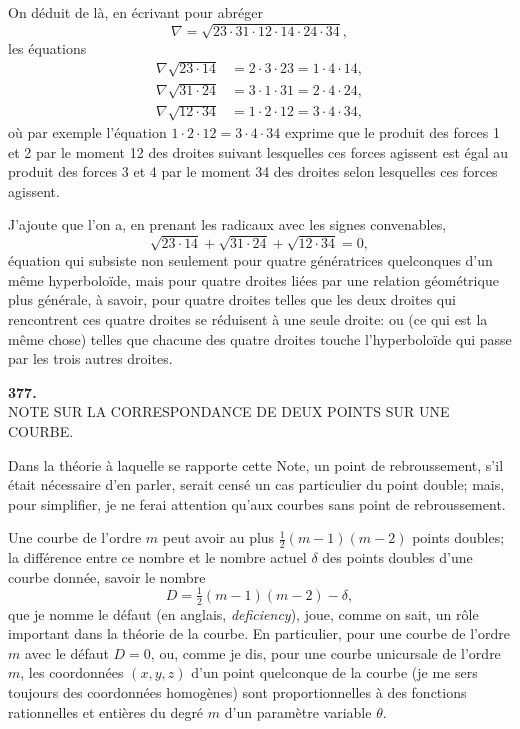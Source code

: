 \documentclass[11pt]{article}
\begin{document}
On d\'eduit de l\`a, en \'ecrivant pour abr\'eger
\[ \nabla = \sqrt{23\cdot 31\cdot 12\cdot 14\cdot 24\cdot 34}, \]
les \'equations
\begin{align*}
\nabla\sqrt{23\cdot 14} &= 2\cdot 3\cdot 23 = 1\cdot 4\cdot 14,\\
\nabla\sqrt{31\cdot 24} &= 3\cdot 1\cdot 31 = 2\cdot 4\cdot 24,\\
\nabla\sqrt{12\cdot 34} &= 1\cdot 2\cdot 12 = 3\cdot 4\cdot 34,
\end{align*}
o\`u par exemple l'\'equation $1\cdot 2\cdot 12 = 3\cdot 4\cdot 34$ exprime que le produit des forces 1 et 2 par le moment 12 des droites suivant lesquelles ces forces agissent est \'egal au produit des forces 3 et 4 par le moment 34 des droites selon lesquelles ces forces agissent.

J'ajoute que l'on a, en prenant les radicaux avec les signes convenables,
\[ \sqrt{23\cdot 14} + \sqrt{31\cdot 24} + \sqrt{12\cdot 34} = 0, \]
\'equation qui subsiste non seulement pour quatre g\'en\'eratrices quelconques d'un m\^eme hyperbolo\"ide, mais pour quatre droites li\'ees par une relation g\'eom\'etrique plus g\'en\'erale, \`a savoir, pour quatre droites telles que les deux droites qui rencontrent ces quatre droites se r\'eduisent \`a une seule droite: ou (ce qui est la m\^eme chose) telles que chacune des quatre droites touche l'hyperbolo\"ide qui passe par les trois autres droites.

\bigskip

\begin{center}\textbf{377.}\\[2pt]
NOTE SUR LA CORRESPONDANCE DE DEUX POINTS SUR UNE COURBE.\end{center}


\medskip

Dans la th\'eorie \`a laquelle se rapporte cette Note, un point de rebroussement, s'il \'etait n\'ecessaire d'en parler, serait cens\'e un cas particulier du point double; mais, pour simplifier, je ne ferai attention qu'aux courbes sans point de rebroussement.

Une courbe de l'ordre $m$ peut avoir au plus $\tfrac{1}{2}(m-1)(m-2)$ points doubles; la diff\'erence entre ce nombre et le nombre actuel $\delta$ des points doubles d'une courbe donn\'ee, savoir le nombre
\[ D = \tfrac{1}{2}(m-1)(m-2) - \delta, \]
que je nomme le d\'efaut (en anglais, \emph{deficiency}), joue, comme on sait, un r\^ole important dans la th\'eorie de la courbe. En particulier, pour une courbe de l'ordre $m$ avec le d\'efaut $D = 0$, ou, comme je dis, pour une courbe unicursale de l'ordre $m$, les coordonn\'ees $(x, y, z)$ d'un point quelconque de la courbe (je me sers toujours des coordonn\'ees homog\`enes) sont proportionnelles \`a des fonctions rationnelles et enti\`eres du degr\'e $m$ d'un param\`etre variable $\theta$.
\end{document}
